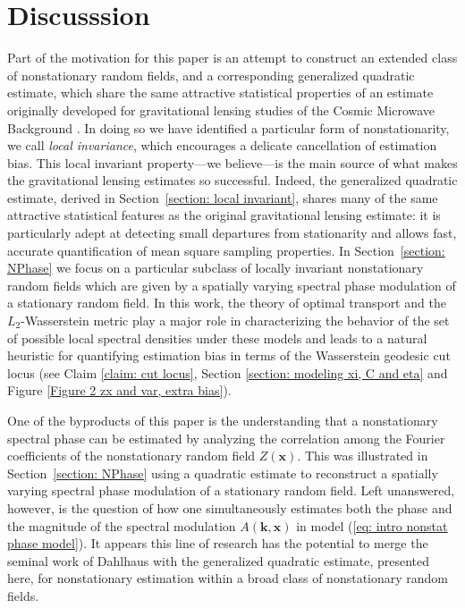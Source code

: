 \documentclass[10pt,noinfoline]{imsart}
\newcommand{\bs}{\boldsymbol}
\begin{document}
%
%
\section{Discusssion}
\label{section: Discussion}

Part of the motivation for this paper is an attempt to construct an extended class of nonstationary random fields, and a corresponding generalized quadratic estimate, which share the same attractive statistical properties of an estimate originally developed for gravitational lensing studies of the Cosmic Microwave Background \cite{hu2001mapping, hu2002mass}.  In doing so we have identified a particular form of nonstationarity, we call {\it local invariance}, which encourages a delicate cancellation of estimation bias. This local invariant property---we believe---is the main source of what makes the gravitational lensing estimates so successful.  Indeed, the generalized quadratic estimate, derived in Section~\ref{section: local invariant}, shares many of the same attractive statistical features as the original gravitational lensing estimate: it is particularly adept at detecting small departures from stationarity and allows fast, accurate quantification of mean square sampling properties.  In Section~\ref{section: NPhase} we focus on a particular subclass of locally invariant nonstationary random fields which are given by a spatially varying spectral phase modulation of a stationary random field. In this work, the theory of optimal transport and the $L_2$-Wasserstein metric play a major role in characterizing the behavior of the set of possible local spectral densities under these models and leads to a natural heuristic for quantifying estimation bias in terms of the Wasserstein geodesic cut locus (see Claim \ref{claim: cut locus}, Section \ref{section: modeling xi, C and eta} and Figure \ref{Figure 2 zx and var, extra bias}).

One of the byproducts of this paper is the understanding that a nonstationary spectral phase can be estimated by analyzing the correlation among the Fourier coefficients of the nonstationary random field $Z(\bs x)$. This was illustrated in Section~\ref{section: NPhase} using a quadratic estimate to reconstruct a spatially varying spectral phase modulation of a stationary random field. Left unanswered, however, is the question of how one simultaneously estimates both the phase and the magnitude of the spectral modulation $A(\bs k, \bs x)$ in model (\ref{eq: intro nonstat phase model}). It appears this line of research has the potential to merge the seminal work of Dahlhaus \cite{dahlhaus1997fitting,dahlhaus2000likelihood} with the generalized quadratic estimate, presented here, for nonstationary estimation within a broad class of nonstationary random fields. 
\end{document}
